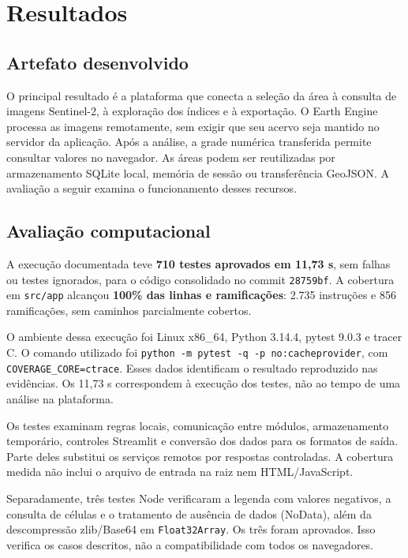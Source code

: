 \section{Resultados}\label{chap:resultados-final}

\subsection{Artefato desenvolvido}

O principal resultado é a plataforma que conecta a seleção da área à consulta de imagens Sentinel-2, à exploração dos índices e à exportação. O Earth Engine processa as imagens remotamente, sem exigir que seu acervo seja mantido no servidor da aplicação. Após a análise, a grade numérica transferida permite consultar valores no navegador. As áreas podem ser reutilizadas por armazenamento SQLite local, memória de sessão ou transferência GeoJSON. A avaliação a seguir examina o funcionamento desses recursos.

\subsection{Avaliação computacional}

A execução documentada teve \textbf{710 testes aprovados em 11,73 s}, sem falhas ou testes ignorados, para o código consolidado no commit \texttt{28759bf}. A cobertura em \texttt{src/app} alcançou \textbf{100\% das linhas e ramificações}: 2.735 instruções e 856 ramificações, sem caminhos parcialmente cobertos.

O ambiente dessa execução foi Linux x86\_64, Python 3.14.4, pytest 9.0.3 e tracer C. O comando utilizado foi \texttt{python -m pytest -q -p no:cacheprovider}, com \texttt{COVERAGE\_CORE=ctrace}. Esses dados identificam o resultado reproduzido nas evidências. Os 11,73 s correspondem à execução dos testes, não ao tempo de uma análise na plataforma.

Os testes examinam regras locais, comunicação entre módulos, armazenamento temporário, controles Streamlit e conversão dos dados para os formatos de saída. Parte deles substitui os serviços remotos por respostas controladas. A cobertura medida não inclui o arquivo de entrada na raiz nem HTML/JavaScript.

Separadamente, três testes Node verificaram a legenda com valores negativos, a consulta de células e o tratamento de ausência de dados (NoData), além da descompressão zlib/Base64 em \texttt{Float32Array}. Os três foram aprovados. Isso verifica os casos descritos, não a compatibilidade com todos os navegadores.

